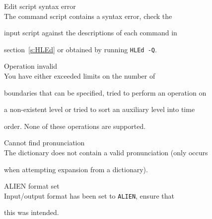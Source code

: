\begin{itemize}





\begin{itemize}


    Edit script syntax error\\


        The  command script contains a syntax error, check the 


        input script against the descriptions of each command in 


        section~\ref{s:HLEd} or obtained by running \texttt{HLEd -Q}.





 Operation invalid\\


        You have either exceeded  limits on the number of 


        boundaries that can be specified, tried to perform an operation on 


        a non-existent level or tried to sort an auxiliary level into time 


        order.  None of these operations are supported.





    Cannot find pronunciation\\


        The dictionary does not contain a valid pronunciation (only occurs


        when attempting expansion from a dictionary).





    ALIEN format set\\


        Input/output format has been set to \texttt{ALIEN}, ensure that 


        this was intended.





\end{itemize}










\begin{itemize}



\end{itemize}
\end{itemize}
